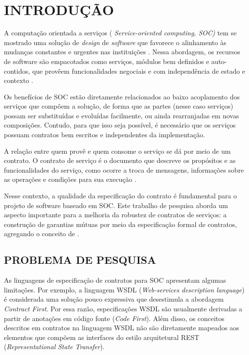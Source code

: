 

\chapter{INTRODUÇÃO}
\vspace{-6mm}

A computação orientada a serviços ( \emph{Service-oriented computing, SOC)} tem
se mostrado uma solução de \textit{design} de \textit{software} que favorece o
alinhamento às mudanças constantes e urgentes nas instituições
\cite{chen2008towards}. Nessa abordagem, os recursos de software são empacotados
como serviços, módulos bem definidos e auto-contidos, que provêem
funcionalidades negociais e com independência de estado e contexto
\cite{papazoglou2007service}.

Os benefícios de SOC estão diretamente relacionados ao
baixo acoplamento dos serviços que compõem a solução, de forma que as partes
(nesse caso serviços) possam ser subs\-ti\-tu\-í\-das e evoluídas facilmente, ou
ainda rearranjadas em novas composições. Contudo, para que isso seja possível, é
necessário que os serviços possuam contratos bem escritos e independentes da
implementação.

A relação entre quem provê e quem consome o serviço se
dá por meio de um contrato. O contrato de serviço é o documento que descreve os
propósitos e as funcionalidades do serviço, como ocorre a troca de mensagens,
informações sobre as operações e condições para sua execução \cite{erl2009web}.

Nesse contexto, a qualidade da especificação do contrato é fundamental para o
projeto de software baseado em SOC. Este trabalho de pesquisa aborda um aspecto
importante para a melhoria da robustez de contratos de serviços: a construção de
garantias mútuas por meio da especificação formal de contratos, agregando o
conceito de \designbycontract{}.

\section{PROBLEMA DE PESQUISA}
\vspace{-6mm}

As linguagens de especificação de contratos para SOC apresentam
algumas limitações. Por exemplo, a linguagem WSDL (\emph{Web-services
description language}) \cite{WSDLSite} é considerada uma solução
pouco expressiva que desestimula a abordagem \textit{Contract First}. Por essa
razão, especificações WSDL são usualmente derivadas a partir de anotações em código
fonte (\textit{Code First}).
Além disso, os conceitos descritos em contratos na linguagem WSDL não são
diretamente mapeados aos elementos que compõem as interfaces do estilo
arquitetural REST\cite{fielding2000architectural} (\emph{Representational State Transfer}).

